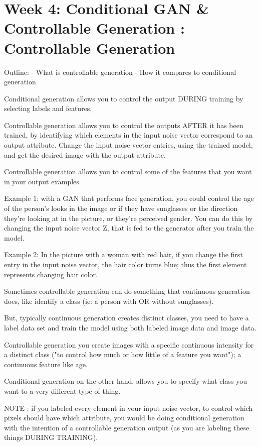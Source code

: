 \documentclass[11pt, onecolumn]{article}
\begin{document}
\section{Week 4: Conditional GAN \& Controllable Generation : Controllable Generation}

Outline:
- What is controllable generation
- How it compares to conditional generation

Conditional generation allows you to control the output DURING training by selecting labels and features,

Controllable generation allows you to control the outputs AFTER it has been trained, by identifying which elements in the input noise vector correspond to an output attribute. Change the input noise vector entries, using the trained model, and get the desired image with the output attribute.

Controllable generation allows you to control some of the features that you want in your output examples. 

Example 1:  with a GAN that performs face generation, you could control the age of the person's looks in the image or if they have sunglasses or the direction they're looking at in the picture, or they're perceived gender. You can do this by changing the input noise vector Z, that is fed to the generator after you train the model.

Example 2: In the picture with a woman with red hair, if you change the first entry in the input noise vector, the hair color turns blue; thus the first element represents changing hair color.

Sometimes controllable generation can do something that continuous generation does, like identify a class (ie: a person with OR without sunglasses). 

But, typically continuous generation creates distinct classes, you need to have a label data set and train the model using both labeled image data and image data.

Controllable generation you create images with a specific continuous intensity for a distinct class ("to control how much or how little of a feature you want"); a continuous feature like age.

Conditional generation on the other hand, allows you to specify what class you want to a very different type of thing.

NOTE : if you labeled every element in your input noise vector, to control which pixels should have which attribute, you would be doing conditional generation with the intention of a controllable generation output (as you are labeling these things DURING TRAINING).  
\end{document}
